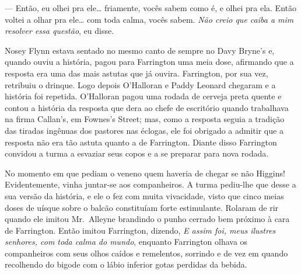 --- Então, eu olhei pra ele\ldots{} friamente, vocês sabem como é, e olhei pra
ela.  Então voltei a olhar pra ele\ldots{} com toda calma, vocês sabem.
\textit{Não creio que caiba a mim resolver essa questão}, eu disse.

Nosey Flynn estava sentado no mesmo canto de sempre no Davy Bryne’s e, quando
ouviu a história, pagou para Farrington uma meia dose, afirmando que a resposta
era uma das mais astutas que já ouvira.  Farrington, por sua vez, retribuiu o
drinque.  Logo depois O’Halloran e Paddy Leonard chegaram e a história foi
repetida.  O’Halloran pagou uma rodada de cerveja preta quente e contou a
história da resposta que dera ao chefe de escritório quando trabalhava na firma
Callan’s, em Fownes’s Street; mas, como a resposta seguia a tradição das
tiradas ingênuas dos pastores nas éclogas, ele foi obrigado a admitir que a
resposta não era tão astuta quanto a de Farrington.  Diante disso Farrington
convidou a turma a esvaziar seus copos e a se preparar para nova rodada.

No momento em que pediam o veneno quem haveria de chegar se não Higgins!
Evidentemente, vinha juntar-se aos companheiros.  A turma pediu-lhe que desse a
sua versão da história, e ele o fez com muita vivacidade, visto que cinco meias
doses de uísque sobre o balcão constituíam forte estimulante.  Rolaram de rir
quando ele imitou Mr.~Alleyne brandindo o punho cerrado bem próximo à cara de
Farrington.  Então imitou Farrington, dizendo, \textit{E assim foi, meus
ilustres senhores, com toda calma do mundo}, enquanto Farrington olhava os
companheiros com seus olhos caídos e remelentos, sorrindo e de vez em quando
recolhendo do bigode com o lábio inferior gotas perdidas da bebida.

